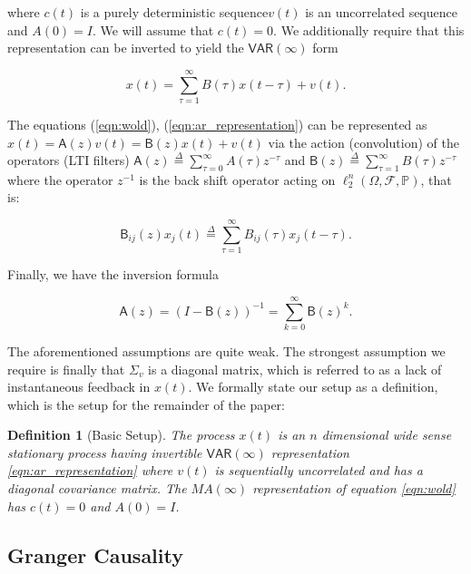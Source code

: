 \documentclass{statsoc}
\def\VAR{\mathsf{VAR}}  %
\def\B{\mathsf{B}}  %
\def\A{\mathsf{A}}  %
\newtheorem{definition}{Definition}
\def\defeq{\overset{\Delta}{=}}  %
\begin{document}
where $c(t)$ is a purely deterministic sequence$v(t)$ is an
uncorrelated sequence and $A(0) = I$.  We will assume that $c(t) = 0$.
We additionally require that this representation can be inverted to
yield the $\VAR(\infty)$ form

\begin{equation}
  \label{eqn:ar_representation}
  x(t) = \sum_{\tau = 1}^\infty B(\tau) x(t - \tau) + v(t).
\end{equation}

The equations (\ref{eqn:wold}), (\ref{eqn:ar_representation}) can be
represented as $x(t) = \A(z)v(t) = \B(z)x(t) + v(t)$ via the action
(convolution) of the operators (LTI filters)
$\A(z) \defeq \sum_{\tau = 0}^\infty A(\tau)z^{-\tau}$ and
$\B(z) \defeq \sum_{\tau = 1}^\infty B(\tau)z^{-\tau}$ where the
operator $z^{-1}$ is the back shift operator acting on
$\ell_2^n(\Omega, \mathcal{F}, \mathbb{P})$, that is:

\begin{equation}
  \label{eqn:filter_action}
  \B_{ij}(z)x_j(t) \defeq \sum_{\tau = 1}^\infty B_{ij}(\tau)x_j(t - \tau).
\end{equation}

Finally, we have the inversion formula

\begin{equation}
  \label{eqn:lsi_inversion}
  \A(z) = (I - \B(z))^{-1} = \sum_{k = 0}^\infty \B(z)^k.
\end{equation}

The aforementioned assumptions are quite weak.  The strongest
assumption we require is finally that $\Sigma_v$ is a diagonal matrix,
which is referred to as a lack of instantaneous feedback in $x(t)$.
We formally state our setup as a definition, which is the setup for
the remainder of the paper:

\begin{definition}[Basic Setup]
  \label{def:basic_setup}
  The process $x(t)$ is an $n$ dimensional wide sense stationary
  process having invertible $\VAR(\infty)$ representation
  \eqref{eqn:ar_representation} where $v(t)$ is sequentially
  uncorrelated and has a diagonal covariance matrix.  The $MA(\infty)$
  representation of equation \eqref{eqn:wold} has $c(t) = 0$ and
  $A(0) = I$.
\end{definition}

\subsection{Granger Causality}
\end{document}

